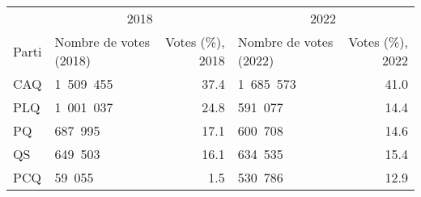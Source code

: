 \begin{table}[!h]
\centering
\begin{tabular}[t]{llrlr}
\toprule
\multicolumn{1}{c}{ } & \multicolumn{2}{c}{2018} & \multicolumn{2}{c}{2022} \\
\cmidrule(l{3pt}r{3pt}){2-3} \cmidrule(l{3pt}r{3pt}){4-5}
Parti & Nombre de votes (2018) & Votes (\%), 2018 & Nombre de votes (2022) & Votes (\%), 2022\\
\midrule
CAQ & 1 509 455 & 37.4 & 1 685 573 & 41.0\\
PLQ & 1 001 037 & 24.8 & 591 077 & 14.4\\
PQ & 687 995 & 17.1 & 600 708 & 14.6\\
QS & 649 503 & 16.1 & 634 535 & 15.4\\
PCQ & 59 055 & 1.5 & 530 786 & 12.9\\
\bottomrule
\end{tabular}
\end{table}
